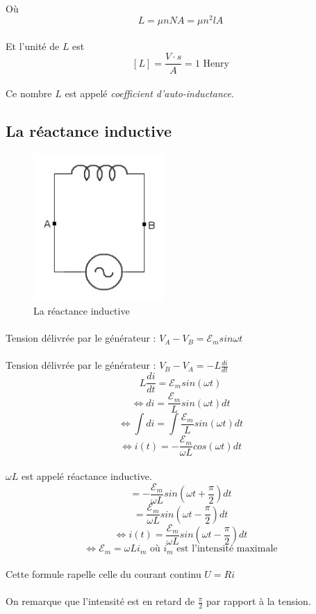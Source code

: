 \documentclass[a4paper]{article}
\begin{document}
\paragraph{}Où
\[L=\mu nNA=\mu n^2lA\]
\paragraph{}Et l'unité de $L$ est
\[[L]=\frac{V\cdot s}{A}=1\text{ Henry}\]
\paragraph{}Ce nombre $L$ est appelé \textit{coefficient d'auto-inductance}.
\subsection{La réactance inductive}
\begin{figure}
\begin{center}
\includegraphics[width=5cm]{imgs/em_1.png}
\end{center}
\caption{La réactance inductive}
\label{La réactance inductive}
\end{figure}
\paragraph{} Tension délivrée par le générateur : $V_A-V_B=\mathscr{E}_msin{\omega t}$
\paragraph{} Tension délivrée par le générateur : $V_B-V_A=-L\frac{di}{dt}$
\[L\frac{di}{dt}=\mathscr{E}_msin(\omega t)\]
\[\Leftrightarrow di=\frac{\mathscr{E}_m}{L}sin(\omega t)dt\]
\[\Leftrightarrow \int di=\int \frac{\mathscr{E}_m}{L}sin(\omega t)dt\]
\[\Leftrightarrow i(t)=-\frac{\mathscr{E}_m}{\omega L}cos(\omega t)dt\]
\paragraph {} $\omega L$ est appelé réactance inductive.
\[=-\frac{\mathscr{E}_m}{\omega L}sin\left(\omega t+ \frac{\pi}{2}\right)dt\]
\[=\frac{\mathscr{E}_m}{\omega L}sin\left(\omega t- \frac{\pi}{2}\right)dt\]
\[\Leftrightarrow i(t)=\frac{\mathscr{E}_m}{\omega L}sin\left(\omega t- \frac{\pi}{2}\right)dt\]
\[\Leftrightarrow \mathscr{E}_m=\omega Li_m \text{ où $i_m$ est l'intensité maximale}\]
\paragraph{}Cette formule rapelle celle du courant continu $U=Ri$
\paragraph{}On remarque que l'intensité est en retard de $\frac{\pi}{2}$ par rapport à la tension.
\end{document}

